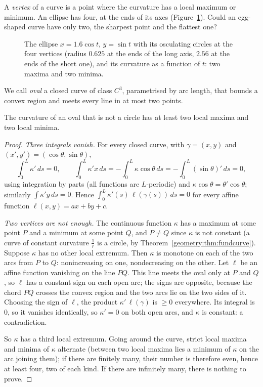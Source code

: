 A \emph{vertex} of a curve is a point where the curvature has a local maximum or minimum. An ellipse has four, at the ends of its axes
(Figure~\ref{geometry:fig:vertices}). Could an egg-shaped curve have only two, the sharpest point and the flattest one?

\begin{figure}[ht]
\centering
{}
\caption{The ellipse $x=1.6\cos t$, $y=\sin t$ with its osculating circles at the four vertices (radius $0.625$ at the ends of the long axis, $2.56$ at the ends of
the short one), and its curvature as a function of $t$: two maxima and two minima.}
\label{geometry:fig:vertices}
\end{figure}

We call \emph{oval} a closed curve of class $C^3$, parametrised by arc length, that bounds a convex region and meets every line in at most two points.

\begin{theorem}\label{geometry:thm:fourvertex}
The curvature of an oval that is not a circle has at least two local maxima and two local minima.
\end{theorem}

\begin{proof}
\emph{Three integrals vanish.} For every closed curve, with $\gamma=(x,y)$ and $(x',y')=(\cos\theta,\sin\theta)$,
\[
\int_0^L\kappa'\,ds=0,\qquad\int_0^L\kappa'x\,ds=-\int_0^L\kappa\cos\theta\,ds=-\int_0^L(\sin\theta)'\,ds=0,
\]
using integration by parts (all functions are $L$-periodic) and $\kappa\cos\theta=\theta'\cos\theta$; similarly $\int\kappa'y\,ds=0$. Hence
$\int_0^L\kappa'(s)\,\ell(\gamma(s))\,ds=0$ for every affine function $\ell(x,y)=ax+by+c$.

\emph{Two vertices are not enough.} The continuous function $\kappa$ has a maximum at some point $P$ and a minimum at some point $Q$, and $P\ne Q$ since $\kappa$ is
not constant (a curve of constant curvature $\frac1r$ is a circle, by Theorem~\ref{geometry:thm:fundcurve}). Suppose $\kappa$ has no other local extremum. Then $\kappa$ is
monotone on each of the two arcs from $P$ to $Q$: nonincreasing on one, nondecreasing on the other. Let $\ell$ be an affine function vanishing on the line $PQ$. This
line meets the oval only at $P$ and $Q$, so $\ell$ has a constant sign on each open arc; the signs are opposite, because the chord $PQ$ crosses the convex region
and the two arcs lie on the two sides of it. Choosing the sign of $\ell$, the product $\kappa'\,\ell(\gamma)$ is $\ge0$ everywhere. Its integral is $0$, so it vanishes
identically, so $\kappa'=0$ on both open arcs, and $\kappa$ is constant: a contradiction.

So $\kappa$ has a third local extremum. Going around the curve, strict local maxima and minima of $\kappa$ alternate (between two local maxima lies a minimum of $\kappa$ on
the arc joining them); if there are finitely many, their number is therefore even, hence at least four, two of each kind. If there are infinitely many, there is
nothing to prove.
\end{proof}

